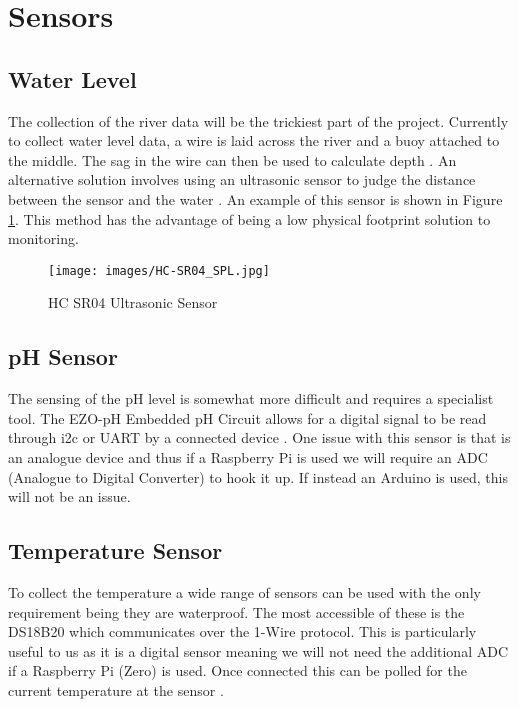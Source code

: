\section{Sensors}
\subsection{Water Level}
The collection of the river data will be the trickiest part of the project. Currently to collect water level data, a wire is laid across the river and a buoy attached to the middle. The sag in the wire can then be used to calculate depth \citep{SEPA2016}. An alternative solution involves using an ultrasonic sensor to judge the distance between the sensor and the water \citep{AravindJayan2016}. An example of this sensor is shown in Figure \ref{fig:hcsr04}. This method has the advantage of being a low physical footprint solution to monitoring. 

\begin{figure}[H]
	\centering
	\texttt{[image: images/HC-SR04\_SPL.jpg]}\\
	\caption{ HC SR04 Ultrasonic Sensor \citep{MouserElectronics}}
	\label{fig:hcsr04}
\end{figure}

\subsection{pH Sensor}
The sensing of the pH level is somewhat more difficult and requires a specialist tool. The EZO-pH Embedded pH Circuit \citep{AtlasScientific2018a} allows for a digital signal to be read through i2c or UART by a connected device \citep{Dey2018}. One issue with this sensor is that is an analogue device and thus if a Raspberry Pi is used we will require an ADC (Analogue to Digital Converter) to hook it up. If instead an Arduino is used, this will not be an issue.

\subsection{Temperature Sensor}
To collect the temperature a wide range of sensors can be used with the only requirement being they are waterproof. The most accessible of these is the DS18B20 \citep{DS18B20} which communicates over the 1-Wire protocol. This is particularly useful to us as it is a digital sensor meaning we will not need the additional ADC if a Raspberry Pi (Zero) is used. Once connected this can be polled for the current temperature at the sensor \citep{Monk2013}.